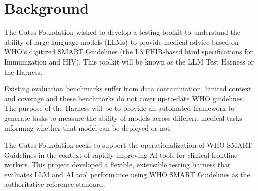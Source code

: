 
\section{Background}
The Gates Foundation wished to develop a testing toolkit to understand the ability of large language models (LLMs) to provide medical advice based on WHO's digitized SMART Guidelines (the L3 FHIR-based html specifications for Immunization and HIV). This toolkit will be known as the LLM Test Harness or the Harness.

Existing evaluation benchmarks suffer from data contamination, limited context and coverage and these benchmarks do not cover up-to-date WHO guidelines. The purpose of the Harness will be to provide an automated framework to generate tasks to measure the ability of models across different medical tasks informing whether that model can be deployed or not.

The Gates Foundation seeks to support the operationalization of WHO SMART Guidelines in the context of rapidly improving AI tools for clinical frontline workers. This project developed a flexible, extensible testing harness that evaluates LLM and AI tool performance using WHO SMART Guidelines as the authoritative reference standard.
